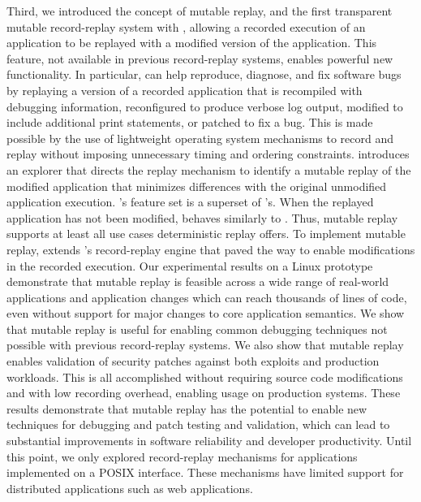 Third, we introduced the concept of mutable replay, and the first transparent
mutable record-replay system with \dora, allowing a recorded execution of an
application to be replayed with a modified version of the application. This
feature, not available in previous record-replay systems, enables powerful new
functionality. In particular, \dora can help reproduce, diagnose, and fix
software bugs by replaying a version of a recorded application that is
recompiled with debugging information, reconfigured to produce verbose log
output, modified to include additional print statements, or patched to fix a
bug.  This is made possible by the use of lightweight operating system
mechanisms to record and replay without imposing unnecessary timing and ordering
constraints.  \dora introduces an explorer that directs the replay mechanism to
identify a mutable replay of the modified application that minimizes differences
with the original unmodified application execution.
\dora's feature set is a superset of \scribe's. When the replayed application
has not been modified, \dora behaves similarly to \scribe. Thus, mutable replay
supports at least all use cases deterministic replay offers.
To implement mutable replay, \dora extends \racepro's record-replay engine
that paved the way to enable modifications in the recorded execution.
Our experimental results on a Linux prototype demonstrate that mutable
replay is feasible across a wide range of real-world applications and
application changes which can reach thousands of lines of code, even
without support for major changes to core application semantics.  We
show that mutable replay is useful for enabling common debugging
techniques not possible with previous record-replay systems.  We
also show that mutable replay enables validation of security patches
against both exploits and production workloads. This is all
accomplished without requiring source code modifications and with low
recording overhead, enabling usage on production systems.  These
results demonstrate that mutable replay has the potential to enable
new techniques for debugging and patch testing and validation, which
can lead to substantial improvements in software reliability and developer
productivity.
Until this point, we only explored record-replay mechanisms for applications
implemented on a POSIX interface. These mechanisms have limited support for
distributed applications such as web applications.

